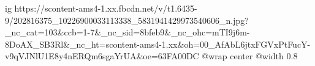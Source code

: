  
 
 
 
 

\ifcmt
  ig https://scontent-ams4-1.xx.fbcdn.net/v/t1.6435-9/202816375_10226900033113338_5831941429973540606_n.jpg?_nc_cat=103&ccb=1-7&_nc_sid=8bfeb9&_nc_ohc=mTI9j6m-8DoAX_SB3Rl&_nc_ht=scontent-ams4-1.xx&oh=00_AfAbL6jtxFGVxPtFucY-v9qVJNlU1E8y4nERQm6sgaYrUA&oe=63FA00DC
  @wrap center
  @width 0.8
\fi
